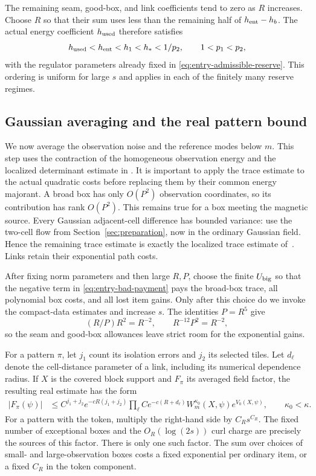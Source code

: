The remaining seam, good-box, and link coefficients tend to zero
as $R$ increases. Choose $R$ so that their sum uses less than the
remaining half of $h_{\rm ent}-h_b$. The actual energy coefficient
$h_{\rm used}$ therefore satisfies
\[
        h_{\rm used}<h_{\rm ent}<h_1<h_*<1/p_2,
                   \qquad 1<p_1<p_2,
\]
with the regulator parameters already fixed in
\eqref{eq:entry-admissible-reserve}. This ordering is uniform for
large $s$ and applies in each of the finitely many reserve regimes.

\subsection{Gaussian averaging and the real pattern bound}

We now average the observation noise and the reference modes below
$m$. This step uses the contraction of the homogeneous observation
energy and the localized determinant estimate in
\cite[Lemma 9.2]{B}. It is important to apply the
trace estimate to the actual quadratic costs before replacing them
by their common energy majorant. A broad box has only $O(P^2)$
observation coordinates, so its contribution has rank $O(P^2)$.
This remains true for a box meeting the magnetic source. Every
Gaussian adjacent-cell difference has bounded variance: use the
two-cell flow from Section~\ref{sec:preparation}, now in the
ordinary Gaussian field. Hence the remaining trace estimate is
exactly the localized trace estimate of~\cite[Equation
(5.24)]{X}. Links retain their exponential path costs.

After fixing norm parameters and then large $R,P$, choose the finite
$U_{\rm big}$ so that the negative term in
\eqref{eq:entry-bad-payment} pays the broad-box trace, all polynomial
box costs, and all lost item gains. Only after this choice do we
invoke the compact-data estimates and increase $s$. The identities
$P=R^5$ give
\[
       (R/P)R^2=R^{-2},\qquad R^{-12}P^2=R^{-2},
\]
so the seam and good-box allowances leave strict room for the
exponential gains.

For a pattern $\pi$, let $j_1$ count its isolation errors and $j_2$
its selected tiles. Let $d_\ell$ denote the cell-distance parameter
of a link, including its numerical dependence radius. If $X$ is the
covered block support and $F_\pi$ its averaged field factor, the
resulting real estimate has the form
\begin{align}\label{eq:entry-real-pattern}
 |F_\pi(\psi)|
 &\le C^{j_1+j_2}e^{-cR(j_1+j_2)}
           \prod_\ell Ce^{-c(R+d_\ell)}
                     W_m^{\kappa_0}(X,\psi)e^{V_0(X,\psi)},
       \qquad \kappa_0<\kappa.
\end{align}
For a pattern with the token, multiply the right-hand side by
$C_Rs^{C_R}$. The fixed number of exceptional boxes and the
$O_R(\log(2s))$ curl charge are precisely the sources of this
factor. There is only one such factor. The sum over choices of
small- and large-observation boxes costs a fixed exponential per
ordinary item, or a fixed $C_R$ in the token component.

